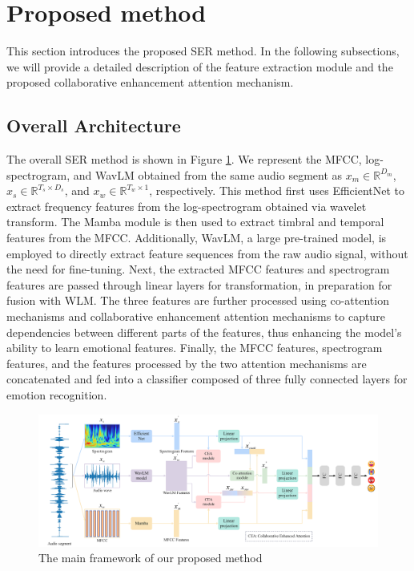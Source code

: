 \documentclass[runningheads]{llncs}
\begin{document}
\section{Proposed method}
This section introduces the proposed SER method. In the following subsections, we will provide a detailed description of the feature extraction module and the proposed collaborative enhancement attention mechanism.

\subsection{Overall Architecture}

The overall SER method is shown in Figure \ref{mainnet}. We represent the MFCC, log-spectrogram, and WavLM obtained from the same audio segment as \(x_m\in \mathbb{R}^{D_m}\), \(x_s\in \mathbb{R}^{T_{s}\times D_s}\), and \(x_w\in \mathbb{R}^{T_{w}\times 1}\), respectively. This method first uses EfficientNet\cite{b18} to extract frequency features from the log-spectrogram obtained via wavelet transform. The Mamba module is then used to extract timbral and temporal features from the MFCC. Additionally, WavLM, a large pre-trained model, is employed to directly extract feature sequences from the raw audio signal, without the need for fine-tuning. Next, the extracted MFCC features and spectrogram features are passed through linear layers for transformation, in preparation for fusion with WLM. The three features are further processed using co-attention\cite{b19} mechanisms and collaborative enhancement attention mechanisms to capture dependencies between different parts of the features, thus enhancing the model's ability to learn emotional features. Finally, the MFCC features, spectrogram features, and the features processed by the two attention mechanisms are concatenated and fed into a classifier composed of three fully connected layers for emotion recognition.
\begin{figure}[htbp]
\centering
\includegraphics[width=1.0\linewidth]{mainnet_colorline_2pt.jpg}
\caption{The main framework of our proposed method}
\label{mainnet}
\end{figure}
\end{document}
